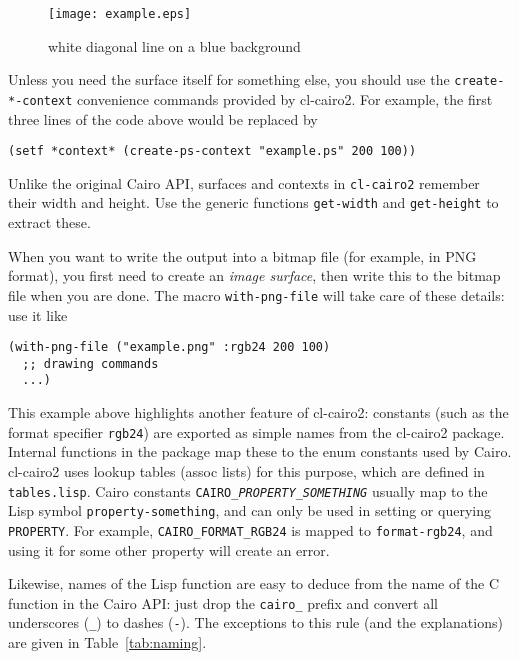 \documentclass[12pt,letterpaper,dvipdfm]{article}
\begin{document}


\begin{figure}[htbp]
  \centering
  \texttt{[image: example.eps]}
  \caption{white diagonal line on a blue background}
  \label{fig:example}
\end{figure}

Unless you need the surface itself for something else, you should use
the \lstinline!create-*-context! convenience commands provided by
cl-cairo2.  For example, the first three lines of the code above would
be replaced by
\begin{lstlisting}
(setf *context* (create-ps-context "example.ps" 200 100))
\end{lstlisting}
Unlike the original Cairo API, surfaces and contexts in
\lstinline!cl-cairo2! remember their width and height.  Use the
generic functions \lstinline!get-width! and \lstinline!get-height! to
extract these.

When you want to write the output into a bitmap file (for example, in
PNG format), you first need to create an \emph{image surface}, then
write this to the bitmap file when you are done.  The macro
\lstinline!with-png-file! will take care of these details: use it like
\begin{lstlisting}
(with-png-file ("example.png" :rgb24 200 100)
  ;; drawing commands
  ...)
\end{lstlisting}

This example above highlights another feature of cl-cairo2: constants
(such as the format specifier \lstinline!rgb24!) are exported as
simple names from the cl-cairo2 package.  Internal functions in the
package map these to the enum constants used by Cairo.  cl-cairo2 uses
lookup tables (assoc lists) for this purpose, which are defined in
\verb!tables.lisp!.  Cairo constants
\texttt{CAIRO\_\textsl{PROPERTY}\_\textsl{SOMETHING}} usually map to
the Lisp symbol \lstinline!property-something!, and can only be used
in setting or querying \texttt{PROPERTY}.  For example,
\verb!CAIRO_FORMAT_RGB24!  is mapped to \lstinline!format-rgb24!, and
using it for some other property will create an error.

Likewise, names of the Lisp function are easy to deduce from the name
of the C function in the Cairo API: just drop the \verb!cairo_! prefix
and convert all underscores (\verb!_!) to dashes (\lstinline!-!).  The
exceptions to this rule (and the explanations) are given in
Table~\ref{tab:naming}.
\end{document}
